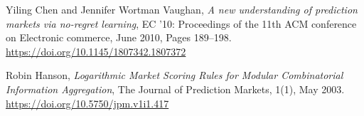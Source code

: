 \documentclass[12pt]{article}
\begin{document}
\newpage

\begin{thebibliography}{9}
      Yiling Chen and Jennifer Wortman Vaughan,
      \emph{A new understanding of prediction markets via no-regret learning},
      EC '10: Proceedings of the 11th ACM conference on Electronic commerce,
      June 2010, Pages 189–198.
      \url{https://doi.org/10.1145/1807342.1807372}

      Robin Hanson,
      \emph{Logarithmic Market Scoring Rules for Modular Combinatorial Information Aggregation},
      The Journal of Prediction Markets, 1(1),
      May 2003.
      \url{https://doi.org/10.5750/jpm.v1i1.417}
\end{thebibliography}
\end{document}

